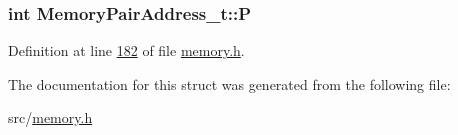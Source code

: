\subsubsection[{\texorpdfstring{P}{P}}]{\setlength{\rightskip}{0pt plus 5cm}int Memory\+Pair\+Address\+\_\+t\+::P}\hypertarget{structMemoryPairAddress__t_a5bc11426b27565b959f280dd1a18b080}{}\label{structMemoryPairAddress__t_a5bc11426b27565b959f280dd1a18b080}


Definition at line \hyperlink{memory_8h_source_l00182}{182} of file \hyperlink{memory_8h_source}{memory.\+h}.



The documentation for this struct was generated from the following file\+:\begin{DoxyCompactItemize}
\item 
src/\hyperlink{memory_8h}{memory.\+h}\end{DoxyCompactItemize}
